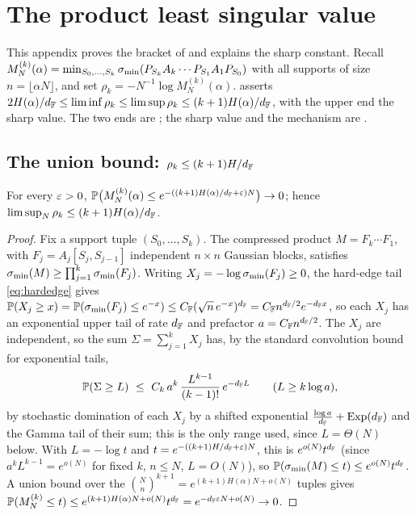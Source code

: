 \section{The product least singular value}\label{app:product}

This appendix proves the bracket of  and explains the sharp constant. Recall
$M_N^{(k)}(\alpha)=\min_{S_0,\dots,S_k}\sigma_{\min}(P_{S_k}A_k\cdots P_{S_1}A_1P_{S_0})$ with all supports of
size $n=\lfloor\alpha N\rfloor$, and set $\rho_k=-N^{-1}\log M_N^{(k)}(\alpha)$. 
asserts $2H(\alpha)/d_{\mathbb{F}}\le\liminf\rho_k\le\limsup\rho_k\le(k+1)H(\alpha)/d_{\mathbb{F}}$, with the upper end the
sharp value. The two ends are ; the sharp value and the
mechanism are .

\subsection{The union bound: $\rho_k\le(k+1)H/d_{\mathbb{F}}$}
\begin{proposition}\label{prop:prod-upper}
For every $\varepsilon>0$, $\mathbb{P}\bigl(M_N^{(k)}(\alpha)\le e^{-((k+1)H(\alpha)/d_{\mathbb{F}}+\varepsilon)N}\bigr)\to0$; hence
$\limsup_N\rho_k\le(k+1)H(\alpha)/d_{\mathbb{F}}$.
\end{proposition}
\begin{proof}
Fix a support tuple $(S_0,\dots,S_k)$. The compressed product $M=F_k\cdots F_1$, with
$F_j=A_j[S_j,S_{j-1}]$ independent $n\times n$ Gaussian blocks, satisfies $\sigma_{\min}(M)\ge\prod_{j=1}^k\sigma_{\min}(F_j)$.
Writing $X_j=-\log\sigma_{\min}(F_j)\ge0$, the hard-edge tail \eqref{eq:hardedge} gives
$\mathbb{P}(X_j\ge x)=\mathbb{P}(\sigma_{\min}(F_j)\le e^{-x})\le C_{\mathbb{F}}(\sqrt n\,e^{-x})^{d_{\mathbb{F}}}=C_{\mathbb{F}} n^{d_{\mathbb{F}}/2}e^{-d_{\mathbb{F}} x}$, so each
$X_j$ has an exponential upper tail of rate $d_{\mathbb{F}}$ and prefactor $a=C_{\mathbb{F}} n^{d_{\mathbb{F}}/2}$. The $X_j$ are
independent, so the sum $\Sigma=\sum_{j=1}^kX_j$ has, by the standard convolution bound for exponential
tails,
\[
  \PP(\Sigma\ge L)\ \le\ C_k\,a^k\,\frac{L^{k-1}}{(k-1)!}\,e^{-\dF L}\qquad(L\ge k\log a),
\]
by stochastic domination of each $X_j$ by a shifted exponential $\tfrac{\log a}{d_{\mathbb{F}}}+\mathrm{Exp}(d_{\mathbb{F}})$
and the Gamma tail of their sum; this is the only range used, since $L=\Theta(N)$ below.
With $L=-\log t$ and $t=e^{-((k+1)H/d_{\mathbb{F}}+\varepsilon)N}$, this is $e^{o(N)}t^{d_{\mathbb{F}}}$ (since $a^kL^{k-1}=e^{o(N)}$ for
fixed $k$, $n\le N$, $L=O(N)$), so $\mathbb{P}(\sigma_{\min}(M)\le t)\le e^{o(N)}t^{d_{\mathbb{F}}}$. A union bound over the
$\binom Nn^{k+1}=e^{(k+1)H(\alpha)N+o(N)}$ tuples gives
$\mathbb{P}(M_N^{(k)}\le t)\le e^{(k+1)H(\alpha)N+o(N)}t^{d_{\mathbb{F}}}=e^{-d_{\mathbb{F}}\varepsilon N+o(N)}\to0$.
\end{proof}

